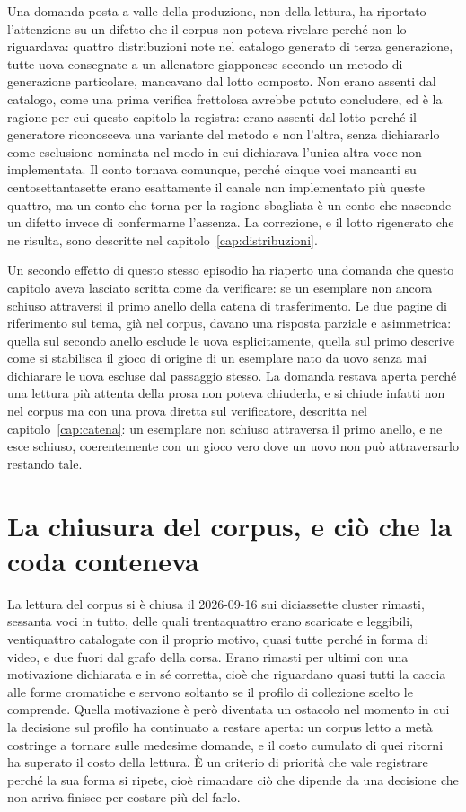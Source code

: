 Una domanda posta a valle della produzione, non della lettura, ha riportato l'attenzione su un difetto che il corpus non poteva rivelare perché non lo riguardava: quattro distribuzioni note nel catalogo generato di terza generazione, tutte uova consegnate a un allenatore giapponese secondo un metodo di generazione particolare, mancavano dal lotto composto. Non erano assenti dal catalogo, come una prima verifica frettolosa avrebbe potuto concludere, ed è la ragione per cui questo capitolo la registra: erano assenti dal lotto perché il generatore riconosceva una variante del metodo e non l'altra, senza dichiararlo come esclusione nominata nel modo in cui dichiarava l'unica altra voce non implementata. Il conto tornava comunque, perché cinque voci mancanti su centosettantasette erano esattamente il canale non implementato più queste quattro, ma un conto che torna per la ragione sbagliata è un conto che nasconde un difetto invece di confermarne l'assenza. La correzione, e il lotto rigenerato che ne risulta, sono descritte nel capitolo~\ref{cap:distribuzioni}.

Un secondo effetto di questo stesso episodio ha riaperto una domanda che questo capitolo aveva lasciato scritta come da verificare: se un esemplare non ancora schiuso attraversi il primo anello della catena di trasferimento. Le due pagine di riferimento sul tema, già nel corpus, davano una risposta parziale e asimmetrica: quella sul secondo anello esclude le uova esplicitamente, quella sul primo descrive come si stabilisca il gioco di origine di un esemplare nato da uovo senza mai dichiarare le uova escluse dal passaggio stesso. La domanda restava aperta perché una lettura più attenta della prosa non poteva chiuderla, e si chiude infatti non nel corpus ma con una prova diretta sul verificatore, descritta nel capitolo~\ref{cap:catena}: un esemplare non schiuso attraversa il primo anello, e ne esce schiuso, coerentemente con un gioco vero dove un uovo non può attraversarlo restando tale.

\section{La chiusura del corpus, e ciò che la coda conteneva}

La lettura del corpus si è chiusa il 2026-09-16 sui diciassette cluster rimasti, sessanta voci in tutto, delle quali trentaquattro erano scaricate e leggibili, ventiquattro catalogate con il proprio motivo, quasi tutte perché in forma di video, e due fuori dal grafo della corsa. Erano rimasti per ultimi con una motivazione dichiarata e in sé corretta, cioè che riguardano quasi tutti la caccia alle forme cromatiche e servono soltanto se il profilo di collezione scelto le comprende. Quella motivazione è però diventata un ostacolo nel momento in cui la decisione sul profilo ha continuato a restare aperta: un corpus letto a metà costringe a tornare sulle medesime domande, e il costo cumulato di quei ritorni ha superato il costo della lettura. È un criterio di priorità che vale registrare perché la sua forma si ripete, cioè rimandare ciò che dipende da una decisione che non arriva finisce per costare più del farlo.

